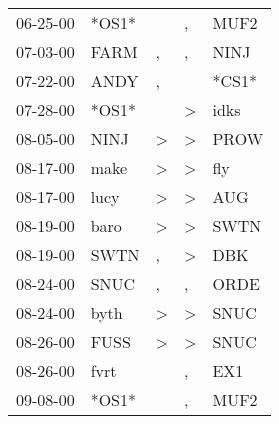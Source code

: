 \begin{supertabular}{p{0.07\textwidth}p{0.06\textwidth}p{0.02\textwidth}p{0.02\textwidth}p{0.06\textwidth}}
          06-25-00\textsuperscript{} &                            *OS1* &                  &                , &           MUF2\textsuperscript{} \\
          07-03-00\textsuperscript{} &           FARM\textsuperscript{} &                , &                , &           NINJ\textsuperscript{} \\
          07-22-00\textsuperscript{} &           ANDY\textsuperscript{} &                , &                  &                            *CS1* \\
          07-28-00\textsuperscript{} &                            *OS1* &                  &     \textgreater &           idks\textsuperscript{} \\
          08-05-00\textsuperscript{} &           NINJ\textsuperscript{} &     \textgreater &     \textgreater &           PROW\textsuperscript{} \\
          08-17-00\textsuperscript{} &           make\textsuperscript{} &     \textgreater &     \textgreater &            fly\textsuperscript{} \\
          08-17-00\textsuperscript{} &           lucy\textsuperscript{} &     \textgreater &     \textgreater &            AUG\textsuperscript{} \\
          08-19-00\textsuperscript{} &           baro\textsuperscript{} &     \textgreater &     \textgreater &           SWTN\textsuperscript{} \\
          08-19-00\textsuperscript{} &           SWTN\textsuperscript{} &                , &     \textgreater &            DBK\textsuperscript{} \\
          08-24-00\textsuperscript{} &           SNUC\textsuperscript{} &                , &                , &           ORDE\textsuperscript{} \\
          08-24-00\textsuperscript{} &           byth\textsuperscript{} &     \textgreater &     \textgreater &           SNUC\textsuperscript{} \\
          08-26-00\textsuperscript{} &           FUSS\textsuperscript{} &     \textgreater &     \textgreater &           SNUC\textsuperscript{} \\
          08-26-00\textsuperscript{} &           fvrt\textsuperscript{} &                  &                , &            EX1\textsuperscript{} \\
          09-08-00\textsuperscript{} &                            *OS1* &                  &                , &           MUF2\textsuperscript{} \\

\end{supertabular}
